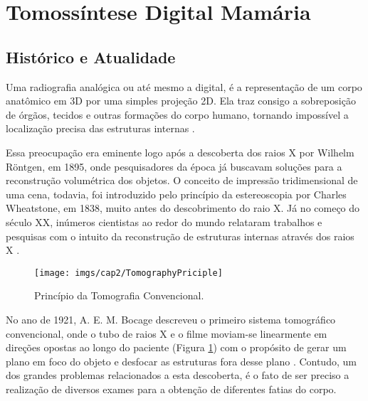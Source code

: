 \section{Tomossíntese Digital Mamária}     

\subsection{Histórico e Atualidade}

Uma radiografia analógica ou até mesmo a digital, é a representação de um corpo anatômico em \acs{3D} por uma simples projeção \acs{2D}. Ela traz consigo a sobreposição de órgãos, tecidos e outras formações do corpo humano, tornando impossível a localização precisa das estruturas internas \cite{levakhina2014three}. 

Essa preocupação era eminente logo após a descoberta dos raios X por Wilhelm Röntgen, em 1895, onde pesquisadores da época já buscavam soluções para a reconstrução volumétrica dos objetos. O conceito de impressão tridimensional de uma cena, todavia, foi introduzido pelo princípio da estereoscopia por Charles Wheatstone, em 1838, muito antes do descobrimento do raio X. Já no começo do século XX, inúmeros cientistas ao redor do mundo relataram trabalhos e pesquisas com o intuito da reconstrução de estruturas internas através dos raios X \cite{dobbins2003digital,levakhina2014three}. 

\begin{figure}[H]
	\caption{Princípio da Tomografia Convencional.}
	\begin{center}
		\texttt{[image: imgs/cap2/TomographyPriciple]}
	\end{center}
	\label{fig:imgCap2TomographyPriciple}
\end{figure}

No ano de 1921, A. E. M. Bocage descreveu o primeiro sistema tomográfico convencional, onde o tubo de raios X e o filme moviam-se linearmente em direções opostas ao longo do paciente (Figura \ref{fig:imgCap2TomographyPriciple}) com o propósito de gerar um plano em foco do objeto e desfocar as estruturas fora desse plano \cite{hsieh2009computed}. Contudo, um dos grandes problemas relacionados a esta descoberta, é o fato de ser preciso a realização de diversos exames para a obtenção de diferentes fatias do corpo. 

